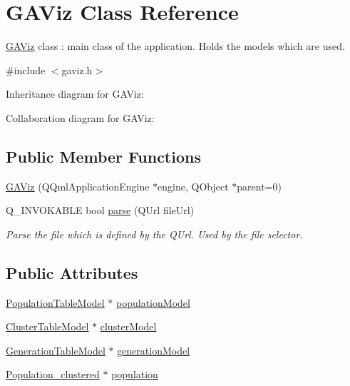 \hypertarget{class_g_a_viz}{}\section{G\+A\+Viz Class Reference}
\label{class_g_a_viz}


\hyperlink{class_g_a_viz}{G\+A\+Viz} class \+: main class of the application. Holds the models which are used.  




{\ttfamily \#include $<$gaviz.\+h$>$}



Inheritance diagram for G\+A\+Viz\+:


Collaboration diagram for G\+A\+Viz\+:
\subsection*{Public Member Functions}
\begin{DoxyCompactItemize}
\item 
\hyperlink{class_g_a_viz_a25d7842507cad8f54ae2ff2b5104efff}{G\+A\+Viz} (Q\+Qml\+Application\+Engine $\ast$engine, Q\+Object $\ast$parent=0)
\item 
Q\+\_\+\+I\+N\+V\+O\+K\+A\+B\+LE bool \hyperlink{class_g_a_viz_aa8c0e575e4948bb03627275b5049ddc9}{parse} (Q\+Url file\+Url)
\begin{DoxyCompactList}\small\item\em Parse the file which is defined by the Q\+Url. Used by the file selector. \end{DoxyCompactList}\end{DoxyCompactItemize}
\subsection*{Public Attributes}
\begin{DoxyCompactItemize}
\item 
\hyperlink{class_population_table_model}{Population\+Table\+Model} $\ast$ \hyperlink{class_g_a_viz_adc930d20d092eeab1badfab22bbc8b6d}{population\+Model}
\item 
\hyperlink{class_cluster_table_model}{Cluster\+Table\+Model} $\ast$ \hyperlink{class_g_a_viz_a54ca452496eac96f82e2d9d7f02318a9}{cluster\+Model}
\item 
\hyperlink{class_generation_table_model}{Generation\+Table\+Model} $\ast$ \hyperlink{class_g_a_viz_a7ecc629f7c9ab499cf483f836371f8f0}{generation\+Model}
\item 
\hyperlink{class_population__clustered}{Population\+\_\+clustered} $\ast$ \hyperlink{class_g_a_viz_a9b5057af4e3badc544bbab1efa0bdb39}{population}
\end{DoxyCompactItemize}



